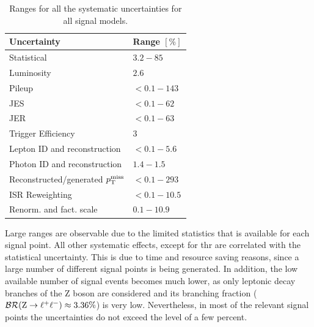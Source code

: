 \begin{table}[tbp]
 \centering
 \caption{Ranges for all the systematic uncertainties for all signal models.}
 \normalsize
 \label{tab:systuncSignal}
 \begin{tabular}[width=\textwidth]{ll}
  Uncertainty                       & Range $[\%]$ \\\hline
  Statistical                       & $3.2-85$     \\
  Luminosity                        & $2.6$        \\
  Pileup                            & $<0.1-143$   \\
  JES                               & $<0.1-62$    \\
  JER                               & $<0.1-63$    \\
  Trigger Efficiency                & $3$          \\
  Lepton ID and reconstruction      & $<0.1-5.6$   \\
  Photon ID and reconstruction      & $1.4-1.5$    \\
  Reconstructed/generated $p_{\mathrm{T}}^\text{miss}$ & $<0.1-293$   \\
  ISR Reweighting                   & $<0.1-10.5$  \\
  Renorm. and fact. scale           & $0.1-10.9$   \\
  \hline
 \end{tabular}
\end{table}
Large ranges are observable due to the limited statistics that is available for each signal point. All other systematic effects, except for thr  are correlated with the statistical uncertainty. This is due to time and resource saving reasons, since a large number of different signal points is being generated. In addition, the low available number of signal events becomes much lower, as only leptonic decay branches of the Z boson are considered and its branching fraction ($\mathcal{BR}(\mathrm{Z}\to\ell^+\ell^-)\approx3.36\%$) is very low. Nevertheless, in most of the relevant signal points the uncertainties do not exceed the level of a few percent.
